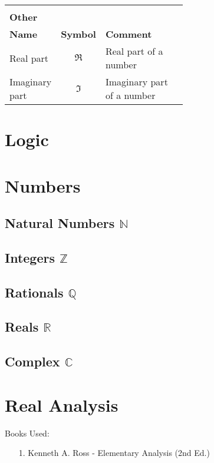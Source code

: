 \documentclass[12pt, english]{book}
\begin{document}
\begin{tabularx}{\textwidth}{ l c p{0.6\linewidth}}
 		& & \\
 		\multicolumn{3}{l}{\textbf{{\large Other}}} \\ [10pt]
 		\hline
 		\textbf{Name} & \textbf{Symbol} & \textbf{Comment} \\
 		\hline
 		Real part 				& $\Re$				& Real part of a number \\
 		Imaginary part 			& $\Im$				& Imaginary part of a number 
	\end{tabularx}

	\section*{}
	\tableofcontents
	
	
	
	\mainmatter
	\part{Logic}
	
	
	\part{Numbers}
	
	\chapter{Natural Numbers $\mathbb{N}$}
	
	\chapter{Integers $\mathbb{Z}$}
	
	\chapter{Rationals $\mathbb{Q}$}
	
	\chapter{Reals $\mathbb{R}$}
	
	\chapter{Complex $\mathbb{C}$}
	

	
	\part{Real Analysis}
	Books Used: 
	\begin{itemize}
		\item[1.] Kenneth A. Ross - Elementary Analysis (2nd Ed.) \cite{Ross.K-Elementary-Analysis-2013}
	\end{itemize}
	
\end{document}
